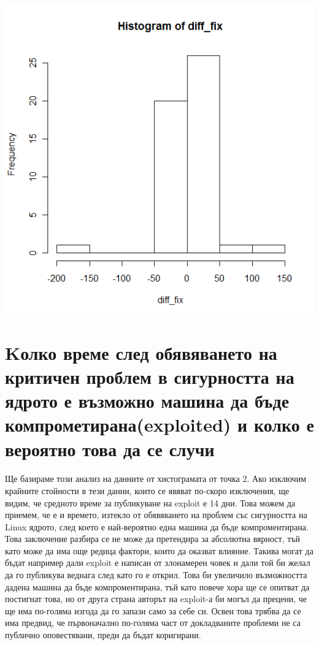 \documentclass[a4paper,12pt,leqno]{article}
\begin{document}
\includegraphics{time_for_fix}

\newpage

\section{Kолко време след обявяването на критичен проблем в сигурността на ядрото е възможно машина да бъде компрометирана(exploited) и колко е вероятно това да се случи}
\paragraph{}
Ще базираме този анализ на данните от хистограмата от точка 2. Ако изключим крайните 
стойности в тези данни, които се явяват по-скоро изключения, ще видим, че средното време за 
публикуване на exploit е 14 дни. Това можем да приемем, че е и времето, изтекло от обявяването 
на проблем със сигурността на Linux ядрото, след което е най-вероятно една машина да бъде 
компроментирана. Това заключение разбира се не може да претендира за абсолютна вярност, тъй 
като може да има още редица фактори, които да оказват влияние. Такива могат да бъдат 
например дали exploit е написан от злонамерен човек и дали той би желал да го публикува 
веднага след като го е открил. Това би увеличило възможността дадена машина да бъде 
компроментирана, тъй като повече хора ще се опитват да постигнат това, но от друга страна 
авторът на exploit-а би могъл да прецени, че ще има по-голяма изгода да го запази само за себе си. 
Освен това трябва да се има предвид, че първоначално по-голяма част от докладваните проблеми 
не са публично оповестявани, преди да бъдат коригирани. 
\end{document}
